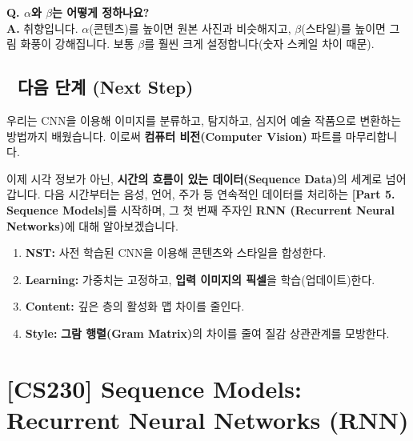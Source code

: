 \documentclass[11pt,a4paper]{book}
\theoremstyle{definition}
\begin{document}
\textbf{Q. $\alpha$와 $\beta$는 어떻게 정하나요?} \\
\textbf{A.} 취향입니다. $\alpha$(콘텐츠)를 높이면 원본 사진과 비슷해지고, $\beta$(스타일)를 높이면 그림 화풍이 강해집니다. 보통 $\beta$를 훨씬 크게 설정합니다(숫자 스케일 차이 때문).

\section*{🔗 다음 단계 (Next Step)}
우리는 CNN을 이용해 이미지를 분류하고, 탐지하고, 심지어 예술 작품으로 변환하는 방법까지 배웠습니다. 이로써 \textbf{컴퓨터 비전(Computer Vision)} 파트를 마무리합니다.

이제 시각 정보가 아닌, \textbf{시간의 흐름이 있는 데이터(Sequence Data)}의 세계로 넘어갑니다. 
다음 시간부터는 음성, 언어, 주가 등 연속적인 데이터를 처리하는 \textbf{[Part 5. Sequence Models]}를 시작하며, 그 첫 번째 주자인 \textbf{RNN (Recurrent Neural Networks)}에 대해 알아보겠습니다.

\vspace{0.5cm}

\begin{summarybox}[title={단원 요약 (Cheat Sheet)}]
\begin{enumerate}
    \item \textbf{NST:} 사전 학습된 CNN을 이용해 콘텐츠와 스타일을 합성한다.
    \item \textbf{Learning:} 가중치는 고정하고, \textbf{입력 이미지의 픽셀}을 학습(업데이트)한다.
    \item \textbf{Content:} 깊은 층의 활성화 맵 차이를 줄인다.
    \item \textbf{Style:} \textbf{그람 행렬(Gram Matrix)}의 차이를 줄여 질감 상관관계를 모방한다.
\end{enumerate}
\end{summarybox}


\chapter{[CS230] Sequence Models: \\ Recurrent Neural Networks (RNN)}
\label{ch:lecture39}

\end{document}
